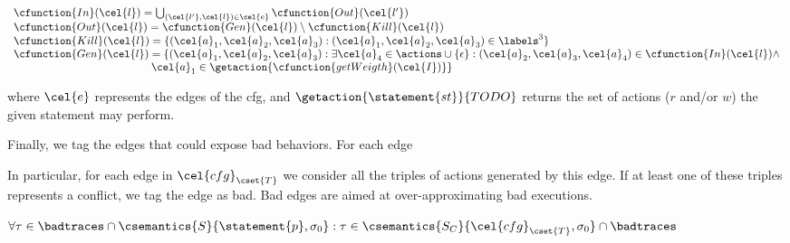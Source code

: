 $$
\begin{array}{l}
\cfunction{In}(\cel{l}) = \bigcup_{(\cel{l'}, \cel{l}) \in \cel{e}} \cfunction{Out}(\cel{l'})\\
\cfunction{Out}(\cel{l}) = \cfunction{Gen}(\cel{l}) \setminus \cfunction{Kill}(\cel{l}) \\
\cfunction{Kill}(\cel{l}) = \{(\cel{a}_1, \cel{a}_2, \cel{a}_3) : (\cel{a}_1, \cel{a}_2, \cel{a}_3) \in \labels^3\}\\
\cfunction{Gen}(\cel{l}) = \{(\cel{a}_1, \cel{a}_2, \cel{a}_3) : \exists \cel{a}_4 \in \actions \cup \{\epsilon\}: (\cel{a}_2, \cel{a}_3, \cel{a}_4) \in \cfunction{In}(\cel{l}) \land\\
\hspace{125pt} \cel{a}_1 \in \getaction{\cfunction{getWeigth}(\cel{I})} \}
\end{array}
$$

where $\cel{e}$ represents the edges of the cfg, and $\getaction{\statement{st}}{TODO}$ returns the set of actions ($r$ and/or $w$) the given statement may perform.

Finally, we tag the edges that could expose bad behaviors. For each edge 


In particular, for each edge in $\cel{cfg}_{\cset{T}}$ we consider all the triples of actions generated by this edge. If at least one of these triples represents a conflict, we tag the edge as bad.
Bad edges are aimed at over-approximating bad executions.

\begin{theorem}
	$\forall \tau \in \badtraces \cap \csemantics{S}{\statement{p}, \sigma_0} : \tau \in \csemantics{S_C}{\cel{cfg}_{\cset{T}}, \sigma_0} \cap \badtraces$
\end{theorem}


